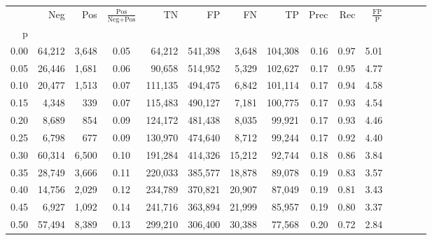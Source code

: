 \begin{tabular}{rrrcrrrrrrrrrrr}
\toprule
{} &     Neg &     Pos & $\frac{\text{Pos}}{\text{Neg}+\text{Pos}}$ &       TN &       FP &       FN &       TP &  Prec &   Rec & $\frac{\text{FP}}{\text{P}}$ \\
p    &         &         &                                            &          &          &          &          &       &       &                              \\
\midrule
0.00 &  64,212 &   3,648 &                                       0.05 &   64,212 &  541,398 &    3,648 &  104,308 &  0.16 &  0.97 &                         5.01 \\
0.05 &  26,446 &   1,681 &                                       0.06 &   90,658 &  514,952 &    5,329 &  102,627 &  0.17 &  0.95 &                         4.77 \\
0.10 &  20,477 &   1,513 &                                       0.07 &  111,135 &  494,475 &    6,842 &  101,114 &  0.17 &  0.94 &                         4.58 \\
0.15 &   4,348 &     339 &                                       0.07 &  115,483 &  490,127 &    7,181 &  100,775 &  0.17 &  0.93 &                         4.54 \\
0.20 &   8,689 &     854 &                                       0.09 &  124,172 &  481,438 &    8,035 &   99,921 &  0.17 &  0.93 &                         4.46 \\
0.25 &   6,798 &     677 &                                       0.09 &  130,970 &  474,640 &    8,712 &   99,244 &  0.17 &  0.92 &                         4.40 \\
0.30 &  60,314 &   6,500 &                                       0.10 &  191,284 &  414,326 &   15,212 &   92,744 &  0.18 &  0.86 &                         3.84 \\
0.35 &  28,749 &   3,666 &                                       0.11 &  220,033 &  385,577 &   18,878 &   89,078 &  0.19 &  0.83 &                         3.57 \\
0.40 &  14,756 &   2,029 &                                       0.12 &  234,789 &  370,821 &   20,907 &   87,049 &  0.19 &  0.81 &                         3.43 \\
0.45 &   6,927 &   1,092 &                                       0.14 &  241,716 &  363,894 &   21,999 &   85,957 &  0.19 &  0.80 &                         3.37 \\
0.50 &  57,494 &   8,389 &                                       0.13 &  299,210 &  306,400 &   30,388 &   77,568 &  0.20 &  0.72 &                         2.84 \\

\end{tabular}
